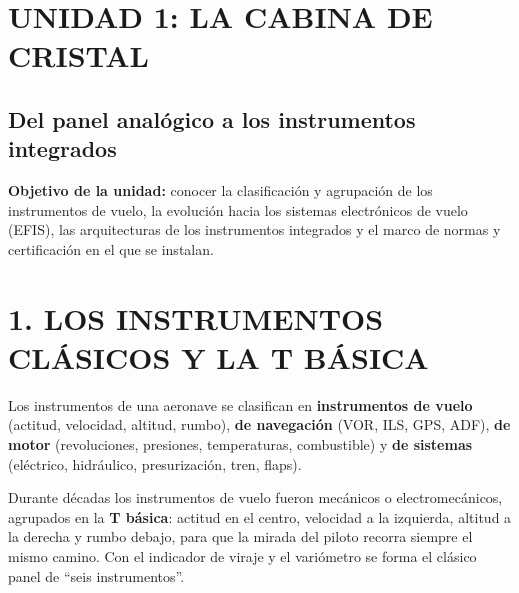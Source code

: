 \clearpage
\section*{UNIDAD 1: LA CABINA DE CRISTAL}
\subsection*{Del panel analógico a los instrumentos integrados}

\begin{recuadro}
\textbf{Objetivo de la unidad:} conocer la clasificación y agrupación de los instrumentos de
vuelo, la evolución hacia los sistemas electrónicos de vuelo (EFIS), las arquitecturas de los
instrumentos integrados y el marco de normas y certificación en el que se instalan.
\end{recuadro}

\section*{1. LOS INSTRUMENTOS CLÁSICOS Y LA T BÁSICA}

Los instrumentos de una aeronave se clasifican en \textbf{instrumentos de vuelo} (actitud,
velocidad, altitud, rumbo), \textbf{de navegación} (VOR, ILS, GPS, ADF), \textbf{de motor}
(revoluciones, presiones, temperaturas, combustible) y \textbf{de sistemas} (eléctrico,
hidráulico, presurización, tren, flaps).

Durante décadas los instrumentos de vuelo fueron mecánicos o electromecánicos, agrupados en la
\textbf{T básica}: actitud en el centro, velocidad a la izquierda, altitud a la derecha y rumbo
debajo, para que la mirada del piloto recorra siempre el mismo camino. Con el indicador de viraje
y el variómetro se forma el clásico panel de ``seis instrumentos''.

